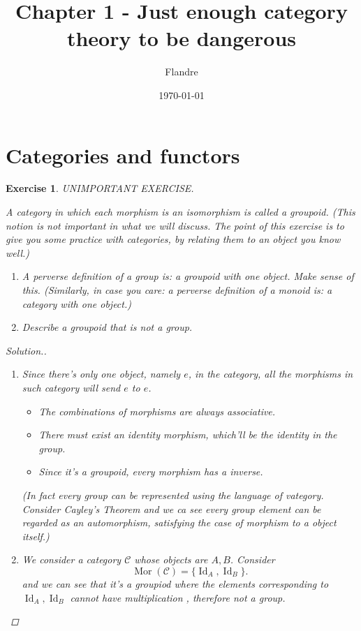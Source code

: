 \documentclass{article}
\title{Chapter 1 - Just enough category theory to be dangerous}
\author{Flandre}
\date{\today}
\theoremstyle{breakstyle}
\newtheorem{exercise}{Exercise}[section]
\newenvironment{solution}
  {\begin{proof}[Solution.]\renewcommand{\qedsymbol}{}}
  {\end{proof}}
\DeclareMathOperator{\id}{Id}
\DeclareMathOperator{\mor}{Mor}
\begin{document}
\maketitle

\section{Categories and functors}
\begin{exercise}
UNIMPORTANT EXERCISE.

A category in which each morphism is an isomorphism is called a groupoid.
(This notion is not important in what we will discuss. The point of this
exercise is to give you some practice with categories, by relating them to
an object you know well.)

\begin{enumerate}[label=({\alph*})]
\item A perverse definition of a group is: a groupoid with one object. Make
    sense of this. (Similarly, in case you care: a perverse definition of a
    monoid is: a category with one object.)
\item Describe a groupoid that is not a group.
\end{enumerate}

\begin{solution}
	\begin{enumerate}
        \item Since there's only one object, namely $e$, in the category, all
            the morphisms in such category will send $e$ to $e$.
			\begin{itemize}
                \item The combinations of morphisms are always associative.
                \item There must exist an identity morphism, which'll be the
                    identity in the group.
				\item Since it's a groupoid, every morphism has a inverse.
			\end{itemize}
            \emph{ (In fact every group can be represented using the language of
            vategory. Consider Cayley's Theorem and we ca see every group
            element can be regarded as an automorphism, satisfying the case of
            morphism to a object itself.) }
        \item We consider a category $\mathscr{C}$ whose objects are $A,B$.
            Consider
			$$
			\mor(\mathscr{C})=\{\id_{A},\id_{B}\}
			.$$ 
            and we can see that it's a groupiod where the elements
            corresponding to $\id_{A},\id_{B}$ cannot have multiplication ,
            therefore not a group.
	\end{enumerate}
\end{solution}

\end{exercise}
\end{document}
